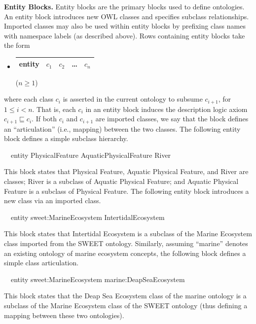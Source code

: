 \documentclass[preprint,number]{elsarticle}
\newcommand{\myblock}[1]{\vspace{12pt}\noindent\textbf{#1}}
\begin{document}
\myblock{Entity Blocks.} Entity blocks are the primary blocks used to
define ontologies. An entity block introduces new OWL classes and
specifies subclass relationships. Imported classes may also be used
within entity blocks by prefixing class names with namespace labels
(as described above).  Rows containing entity blocks take the form
\begin{itemize}
\item[] 
  \begin{tabular}{|l|l|l|l|l|}\hline
    \textsf{entity} & $c_1$ & $c_2$ & \dots & $c_n$ \\ \hline 
  \end{tabular} \hfill ($n \ge 1$)
\end{itemize}
where each class $c_i$ is asserted in the current ontology to subsume
$c_{i+1}$, for $1 \le i < n$. That is, each $c_i$ in an entity block
induces the description logic axiom $c_{i+1} \sqsubseteq c_i$.  If
both $c_i$ and $c_{i+1}$ are imported classes, we say that the block
defines an ``articulation'' (i.e., mapping) between the two
classes. The following entity block defines a simple subclass
hierarchy.
\begin{tabbing}
  ~~\textsf{entity} \textsf{PhysicalFeature} 
    \textsf{AquaticPhysicalFeature} \textsf{River}
\end{tabbing}
This block states that Physical Feature, Aquatic Physical Feature, and
River are classes; River is a subclass of Aquatic Physical Feature;
and Aquatic Physical Feature is a subclass of Physical Feature. The
following entity block introduces a new class via an imported class.
\begin{tabbing}
  ~~\textsf{entity} \textsf{sweet:MarineEcosystem} 
    \textsf{IntertidalEcosystem}
\end{tabbing}
This block states that Intertidal Ecosystem is a subclass of the
Marine Ecosystem class imported from the SWEET ontology. Similarly,
assuming ``marine'' denotes an existing ontology of marine ecosystem
concepts, the following block defines a simple class articulation.
\begin{tabbing}
  ~~\textsf{entity} \textsf{sweet:MarineEcosystem} 
    \textsf{marine:DeapSeaEcosystem}
\end{tabbing}
This block states that the Deap Sea Ecosystem class of the marine
ontology is a subclass of the Marine Ecosystem class of the SWEET
ontology (thus defining a mapping between these two ontologies).
\end{document}
